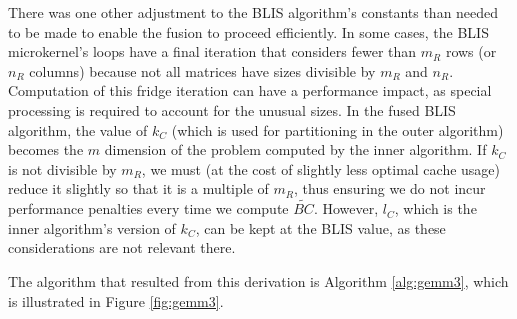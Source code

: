 \documentclass[12pt]{article}
\begin{document}
There was one other adjustment to the BLIS algorithm's constants than needed to be made to enable the fusion to proceed efficiently.
In some cases, the BLIS microkernel's loops have a final iteration that considers fewer than $m_R$ rows (or $n_R$ columns) because not all matrices have sizes divisible by $m_R$ and $n_R$.
Computation of this fridge iteration can have a performance impact, as special processing is required to account for the unusual sizes.
In the fused BLIS algorithm, the value of $k_C$ (which is used for partitioning in the outer algorithm) becomes the $m$ dimension of the problem computed by the inner algorithm.
If $k_C$ is not divisible by $m_R$, we must (at the cost of slightly less optimal cache usage) reduce it slightly so that it is a multiple of $m_R$, thus ensuring we do not incur performance penalties every time we compute $\tilde{BC}$.
However, $l_C$, which is the inner algorithm's version of $k_C$, can be kept at the BLIS value, as these considerations are not relevant there.

The algorithm that resulted from this derivation is Algorithm \ref{alg:gemm3}, which is illustrated in Figure \ref{fig:gemm3}.
\end{document}
